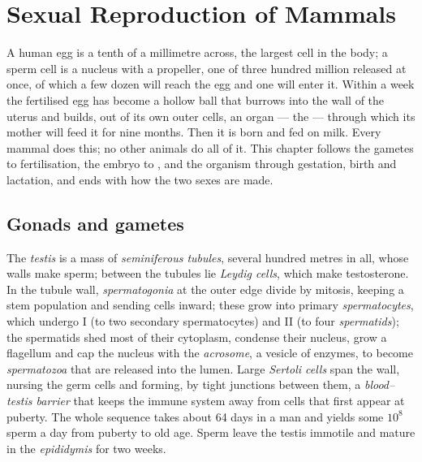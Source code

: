 \chapter{Sexual Reproduction of Mammals}\label{ch:b2:mammal-reproduction}

A human egg is a tenth of a millimetre across, the largest cell in
the body; a sperm cell is a nucleus with a propeller, one of three
hundred million released at once, of which a few dozen will reach
the egg and one will enter it. Within a week the fertilised egg has
become a hollow ball that burrows into the wall of the uterus and
builds, out of its own outer cells, an organ --- the  ---
through which its mother will feed it for nine months. Then it is
born and fed on milk. Every mammal does this; no other animals do
all of it. This chapter follows the gametes to fertilisation, the
embryo to , and the organism through gestation, birth
and lactation, and ends with how the two sexes are made.

\section{Gonads and gametes}

\begin{definition}\label{def:b2:mammal-reproduction:testis}
The \emph{testis} is a mass of \emph{seminiferous tubules}, several
hundred metres in all, whose walls make sperm; between the tubules
lie \emph{Leydig cells}, which make testosterone. In the tubule wall,
\emph{spermatogonia} at the outer edge divide by mitosis, keeping a
stem population and sending cells inward; these grow into primary
\emph{spermatocytes}, which undergo  I (to two secondary
spermatocytes) and  II (to four  \emph{spermatids});
the spermatids shed most of their cytoplasm, condense their nucleus,
grow a flagellum and cap the nucleus with the \emph{acrosome}, a
vesicle of enzymes, to become \emph{spermatozoa} that are released
into the lumen. Large \emph{Sertoli cells} span the wall, nursing the
germ cells and forming, by tight junctions between them, a
\emph{blood--testis barrier} that keeps the immune system away from
cells that first appear at puberty. The whole sequence takes about
\num{64} days in a man and yields some $10^{8}$ sperm a day from
puberty to old age. Sperm leave the testis immotile and mature in
the \emph{epididymis} for two weeks.
\end{definition}

